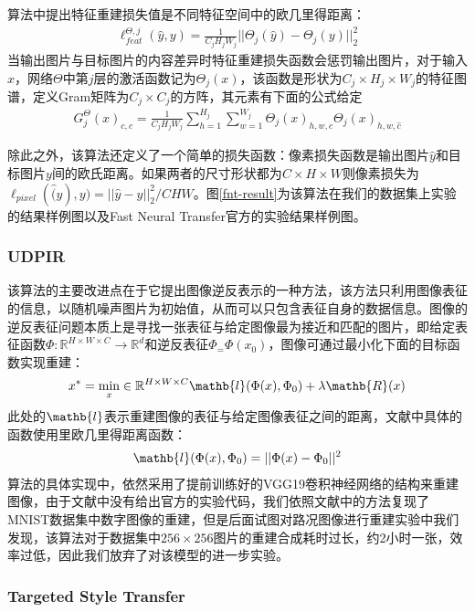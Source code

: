 算法中提出特征重建损失值是不同特征空间中的欧几里得距离：
\begin{align}
    \ell_{feat}^{\Theta,j}(\hat{y},y)=\frac{1}{C_jH_jW_j}||\Theta_j(\hat{y})-\Theta_j(y)||_2^2
\end{align}
当输出图片与目标图片的内容差异时特征重建损失函数会惩罚输出图片，对于输入$x$，网络$\Theta$中第$j$层的激活函数记为$\Theta_j(x)$，该函数是形状为$C_j\times H_j\times W_j$的特征图谱，定义Gram矩阵为$C_j\times C_j$的方阵，其元素有下面的公式给定
\begin{align}
    G_j^{\Theta}(x)_{c,\hat{c}}=\frac{1}{C_jH_jW_j}\sum_{h=1}^{H_j}\sum_{w=1}^{W_j}\Theta_j(x)_{h,w,c}\Theta_j(x)_{h,w,\hat{c}}
\end{align}

除此之外，该算法还定义了一个简单的损失函数：像素损失函数是输出图片$\hat{y}$和目标图片$y$间的欧氏距离。如果两者的尺寸形状都为$C\times H\times W$则像素损失为$\ell_{pixel}(\hat(y),y)=||\hat{y}-y||_2^2/CHW$。图\ref{fnt-result}为该算法在我们的数据集上实验的结果样例图以及Fast Neural Transfer官方的实验结果样例图。 

\subsubsection{UDPIR} 

 该算法的主要改进点在于它提出图像逆反表示的一种方法，该方法只利用图像表征的信息，以随机噪声图片为初始值，从而可以只包含表征自身的数据信息。图像的逆反表征问题本质上是寻找一张表征与给定图像最为接近和匹配的图片，即给定表征函数$\Phi:\mathbb{R}^{H\times W\times C}\to \mathbb{R}^d$和逆反表征$\Phi_=\Phi(x_0)$，图像可通过最小化下面的目标函数实现重建：
\begin{align}
    x^*=\min_x\in \mathbb{R}^{H\times W\times C}\mathb{l}(\Phi(x),\Phi_0)+\lambda\mathb{R}(x)
\end{align}
此处的$\mathb{l}$表示重建图像的表征与给定图像表征之间的距离，文献中具体的函数使用里欧几里得距离函数：
\begin{align}
    \mathb{l}(\Phi(x),\Phi_0)=||\Phi(x)-\Phi_0||^2
\end{align}
算法的具体实现中，依然采用了提前训练好的VGG19卷积神经网络的结构来重建图像，由于文献中没有给出官方的实验代码，我们依照文献中的方法复现了MNIST数据集中数字图像的重建，但是后面试图对路况图像进行重建实验中我们发现，该算法对于数据集中$256\times 256$图片的重建合成耗时过长，约2小时一张，效率过低，因此我们放弃了对该模型的进一步实验。

\subsubsection{Targeted Style Transfer}

